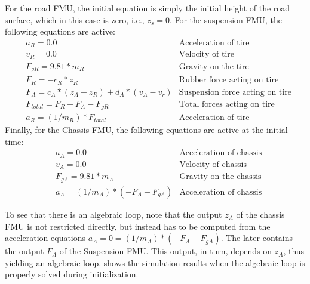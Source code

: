 For the road FMU, the initial equation is simply the initial height of the road surface, which in this case is zero, i.e., $z_s=0$.
For the suspension FMU, the following equations are active:
\begin{align}
& a_R = 0.0 & \text{Acceleration of tire} \\
& v_R = 0.0 & \text{Velocity of tire} \\
& F_{gR} = 9.81 * m_R  & \text{Gravity on the tire} \\
& F_R = - c_R * z_R  & \text{Rubber force acting on tire} \\
& F_A = c_A * (z_A - z_R) + d_A * (v_A - v_r)  & \text{Suspension force acting on tire} \\
& F_{\mathit{total}} = F_R + F_A - F_{gR} & \text{Total forces acting on tire} \\
& a_R = (1/m_R) * F_{\mathit{total}}  & \text{Acceleration of tire}
\end{align}
Finally, for the Chassis FMU, the following equations are active at the initial time:
\begin{align}
& a_A = 0.0 & \text{Acceleration of chassis} \\
& v_A = 0.0 & \text{Velocity of chassis} \\
& F_{gA} = 9.81 * m_A  & \text{Gravity on the chassis} \\
& a_A = (1/m_A) * (- F_A - F_{gA})  & \text{Acceleration of chassis}
\end{align}

To see that there is an algebraic loop, note that the output $z_A$ of the chassis FMU is not restricted directly, but instead has to be computed from the acceleration equations $a_A = 0 = (1/m_A) * (- F_A - F_{gA})$.
The later contains the output $F_A$ of the Suspension FMU.
This output, in turn, depends on $z_A$, thus yielding an algebraic loop.
 shows the simulation results when the algebraic loop is properly solved during initialization.

